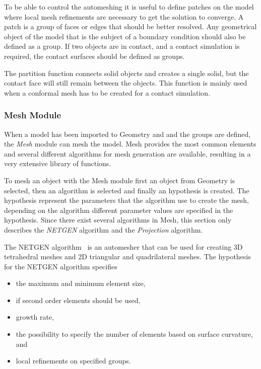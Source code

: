 To be able to control the automeshing it is useful to define patches on the model where local mesh refinements are necessary to get the solution to converge. A patch is a group of faces or edges that should be better resolved. Any geometrical object of the model that is the subject of a boundary condition should also be defined as a group. If two objects are in contact, and a contact simulation is required, the contact surfaces should be defined as groups.

The partition function connects solid objects and creates a single solid, but the contact face will still remain between the objects. This function is mainly used when a conformal mesh has to be created for a contact simulation.~\cite{salomedoc}

\subsubsection{Mesh Module} %
\label{ssub:mesh_module}
When a model has been imported to Geometry and and the groups are defined, the \textit{Mesh} module can mesh the model. Mesh provides the most common elements and several different algorithms for mesh generation are available, resulting in a very extensive library of functions.

To mesh an object with the Mesh module first an object from Geometry is selected, then an algorithm is selected and finally an hypothesis is created. The hypothesis represent the parameters that the algorithm use to create the mesh, depending on the algorithm different parameter values are specified in the hypothesis. Since there exist several algorithms in Mesh, this section only describes the \textit{NETGEN} algorithm and the \textit{Projection} algorithm.

The NETGEN algorithm~\cite{netgen} is an automesher that can be used for creating 3D tetrahedral meshes and 2D triangular and quadrilateral meshes. The hypothesis for the NETGEN algorithm specifies
\begin{itemize}
	\item the maximum and minimum element size, 
	\item if second order elements should be used,
	\item growth rate,
	\item the possibility to specify the number of elements based on surface curvature, and
	\item local refinements on specified groups. 
\end{itemize}


